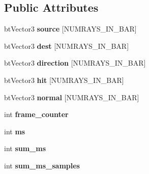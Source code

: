 \subsection*{Public Attributes}
\begin{DoxyCompactItemize}
\item 
\hypertarget{classbt_raycast_bar_a7ae5e7d1c8bdb3f0757be03001794a9a}{bt\+Vector3 {\bfseries source} \mbox{[}N\+U\+M\+R\+A\+Y\+S\+\_\+\+I\+N\+\_\+\+B\+A\+R\mbox{]}}\label{classbt_raycast_bar_a7ae5e7d1c8bdb3f0757be03001794a9a}

\item 
\hypertarget{classbt_raycast_bar_a23f38c9b6df4688012ff1661f8cc56a9}{bt\+Vector3 {\bfseries dest} \mbox{[}N\+U\+M\+R\+A\+Y\+S\+\_\+\+I\+N\+\_\+\+B\+A\+R\mbox{]}}\label{classbt_raycast_bar_a23f38c9b6df4688012ff1661f8cc56a9}

\item 
\hypertarget{classbt_raycast_bar_a14b6b875515853f584078cca3b9be773}{bt\+Vector3 {\bfseries direction} \mbox{[}N\+U\+M\+R\+A\+Y\+S\+\_\+\+I\+N\+\_\+\+B\+A\+R\mbox{]}}\label{classbt_raycast_bar_a14b6b875515853f584078cca3b9be773}

\item 
\hypertarget{classbt_raycast_bar_a7d9b70a3257cb9f962ea45cae3013a74}{bt\+Vector3 {\bfseries hit} \mbox{[}N\+U\+M\+R\+A\+Y\+S\+\_\+\+I\+N\+\_\+\+B\+A\+R\mbox{]}}\label{classbt_raycast_bar_a7d9b70a3257cb9f962ea45cae3013a74}

\item 
\hypertarget{classbt_raycast_bar_ab549d72a0eca4be583441d9ab2447058}{bt\+Vector3 {\bfseries normal} \mbox{[}N\+U\+M\+R\+A\+Y\+S\+\_\+\+I\+N\+\_\+\+B\+A\+R\mbox{]}}\label{classbt_raycast_bar_ab549d72a0eca4be583441d9ab2447058}

\item 
\hypertarget{classbt_raycast_bar_a5267ac2a87b800e7baa4eb64ac8d968f}{int {\bfseries frame\+\_\+counter}}\label{classbt_raycast_bar_a5267ac2a87b800e7baa4eb64ac8d968f}

\item 
\hypertarget{classbt_raycast_bar_aa0f7bf610ab0c48d026cec9c9f87f088}{int {\bfseries ms}}\label{classbt_raycast_bar_aa0f7bf610ab0c48d026cec9c9f87f088}

\item 
\hypertarget{classbt_raycast_bar_a13e55cb055392daf14224bbb064e6026}{int {\bfseries sum\+\_\+ms}}\label{classbt_raycast_bar_a13e55cb055392daf14224bbb064e6026}

\item 
\hypertarget{classbt_raycast_bar_a3cc26a58cdf8203304e4788c011362cb}{int {\bfseries sum\+\_\+ms\+\_\+samples}}\label{classbt_raycast_bar_a3cc26a58cdf8203304e4788c011362cb}


\end{DoxyCompactItemize}
